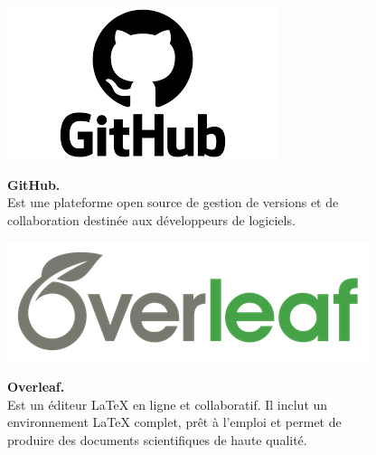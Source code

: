 \vspace{0.5cm}

\begin{figure}[H]
    \centering
    \begin{minipage}[c]{0.3\textwidth}
        \includegraphics[width=\linewidth]{projet/images/diagramme de sequance/images/GITHUB.png}
    \end{minipage}
    \hspace{1cm}
    \begin{minipage}[c]{0.6\textwidth}
        \textbf{GitHub.}\\[0.5em]
        Est une plateforme open source de gestion de versions et de collaboration destinée aux développeurs de logiciels. \cite{ref7}
    \end{minipage}
\end{figure}

\vspace{0.5cm}

\begin{figure}[H]
    \centering
    \begin{minipage}[c]{0.3\textwidth}
        \includegraphics[width=\linewidth]{projet/images/diagramme de sequance/images/Overleaf.png}
    \end{minipage}
    \hspace{1cm}
    \begin{minipage}[c]{0.6\textwidth}
        \textbf{Overleaf.}\\[0.5em]
        Est un éditeur LaTeX en ligne et collaboratif. Il inclut un environnement LaTeX complet, prêt à l’emploi et permet de produire des documents scientifiques de haute qualité. \cite{ref8}
    \end{minipage}
\end{figure}
\vspace{0.5cm}

